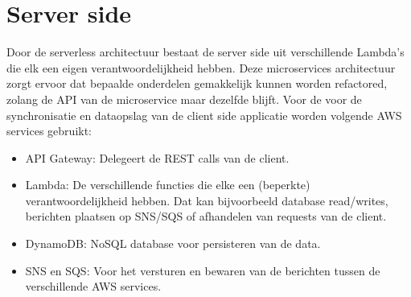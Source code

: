 \section{Server side}
Door de serverless architectuur bestaat de server side uit verschillende Lambda's die elk een eigen verantwoordelijkheid hebben. Deze microservices architectuur zorgt ervoor dat bepaalde onderdelen gemakkelijk kunnen worden refactored, zolang de API van de microservice maar dezelfde blijft. Voor de voor de synchronisatie en dataopslag van de client side applicatie worden volgende AWS services gebruikt:
\begin{itemize}
\item API Gateway: Delegeert de REST calls van de client.
\item Lambda: De verschillende functies die elke een (beperkte) verantwoordelijkheid hebben. Dat kan bijvoorbeeld database read/writes, berichten plaatsen op SNS/SQS of afhandelen van requests van de client.
\item DynamoDB: NoSQL database voor persisteren van de data.
\item SNS en SQS: Voor het versturen en bewaren van de berichten tussen de verschillende AWS services.
\end{itemize}
	